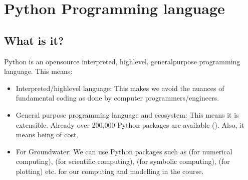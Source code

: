 \documentclass[letterpaper,10pt,english]{sphinxmanual}
\begin{document}
\section{Python Programming language}
\label{\detokenize{contents/background/01_python:python-programming-language}}\label{\detokenize{contents/background/01_python::doc}}

\subsection{What is it?}
\label{\detokenize{contents/background/01_python:what-is-it}}
Python is an open\sphinxhyphen{}source interpreted, high\sphinxhyphen{}level, general\sphinxhyphen{}purpose programming language. This means:
\begin{itemize}
\item {} 
Interpreted/high\sphinxhyphen{}level language: This makes we avoid the nuances of fundamental coding as done by computer programmers/engineers.

\item {} 
General purpose programming language and  ecosystem: This means it is extensible. Already over 200,000 Python packages are available (). Also, it means being  of cost.

\item {} 
For Groundwater: We can use Python packages such as  (for numerical computing),  (for scientific computing),  (for symbolic computing),  (for plotting) etc. for our computing and modelling in the course.

\end{itemize}
\end{document}
